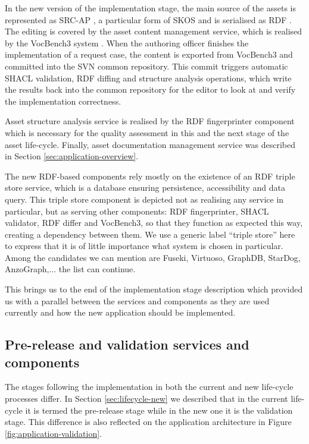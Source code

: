 	In the new version of the implementation stage, the main source of the assets is represented as SRC-AP \cite{src-ap-vb3}, a particular form of SKOS \citep{skos-spec} and is serialised as RDF \citep{rdf11}. The editing is covered by the asset content management service, which is realised by the VocBench3 system \citep{stellatovocbench}. When the authoring officer finishes the implementation of a request case, the content is exported from VocBench3 and committed into the SVN common repository. This commit triggers automatic SHACL validation, RDF diffing and structure analysis operations, which write the results back into the common repository for the editor to look at and verify the implementation correctness. 
	
	Asset structure analysis service is realised by the RDF fingerprinter component which is necessary for the quality assessment in this and the next stage of the asset life-cycle. Finally, asset documentation management service was described in Section \ref{sec:application-overview}. 
	
	The new RDF-based components rely mostly on the existence of an RDF triple store service, which is a database ensuring persistence, accessibility and data query. This triple store component is depicted not as realising any service in particular, but as serving other components: RDF fingerprinter, SHACL validator, RDF differ and VocBench3, so that they function as expected this way, creating a dependency between them. We use a generic label ``triple store'' here to express that it is of little importance what system is chosen in particular. Among the candidates we can mention are Fuseki, Virtuoso, GraphDB, StarDog, AnzoGraph,... the list can continue. 
	
	This brings us to the end of the implementation stage description which provided us with a parallel between the services and components as they are used currently and how the new application should be implemented. 
	
	\subsection{Pre-release and validation services and components}
	\label{sec:validation-application}
	
	The stages following the implementation in both the current and new life-cycle processes differ. In Section \ref{sec:lifecycle-new} we described that in the current life-cycle it is termed the pre-release stage while in the new one it is the validation stage. This difference is also reflected on the application architecture in Figure \ref{fig:application-validation}.
	
